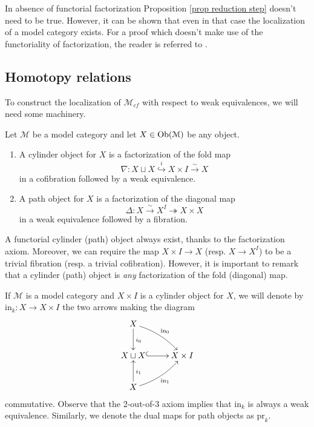 \begin{refsection}
\begin{rmk}
In absence of functorial factorization Proposition \ref{prop reduction step} doesn't need to be true. However, it can be shown that even in that case the localization of a model category exists. For a proof which doesn't make use of the functoriality of factorization, the reader is referred to \cite[section 4]{dwyer-spalinski-homotopy-theories-and-model-categories}.
\end{rmk}

\subsection{Homotopy relations}

To construct the localization of $\mathcal M_{cf}$ with respect to weak equivalences, we will need some machinery.

\begin{defin}
Let $\mathcal M$ be a model category and let $X \in \operatorname{Ob}(\mathcal M)$ be any object.
\begin{enumerate}

\item A cylinder object for $X$ is a factorization of the fold map
\[
\nabla \colon X \sqcup X \stackrel{i}{\hookrightarrow} X \times I \stackrel{\sim}{\to} X
\]
in a cofibration followed by a weak equivalence.

\item A path object for $X$ is a factorization of the diagonal map
\[
\Delta \colon X \stackrel{\sim}{\to} X^I \twoheadrightarrow X \times X
\]
in a weak equivalence followed by a fibration.
\end{enumerate}
\end{defin}

\begin{rmk}
A functorial cylinder (path) object always exist, thanks to the factorization axiom. Moreover, we can require the map $X \times I \to X$ (resp. $X \to X^I$) to be a trivial fibration (resp. a trivial cofibration). However, it is important to remark that a cylinder (path) object is \emph{any} factorization of the fold (diagonal) map.
\end{rmk}

\begin{notation}
If $\mathcal M$ is a model category and $X \times I$ is a cylinder object for $X$, we will denote by $\mathrm{in}_k \colon X \to X \times I$ the two arrows making the diagram
\[
\xymatrix{ X \ar[d]^{i_0} \ar@/^.5pc/[dr]^{\mathrm{in}_0} \\ X \sqcup X \ar@{^(->}[r] & X \times I \\ X \ar[u]_{i_1} \ar@/_.5pc/[ur]_{\mathrm{in}_1} }
\]
commutative. Observe that the 2-out-of-3 axiom implies that $\mathrm{in}_k$ is always a weak equivalence. Similarly, we denote the dual maps for path objects as $\mathrm{pr}_k$.
\end{notation}


\end{refsection}
